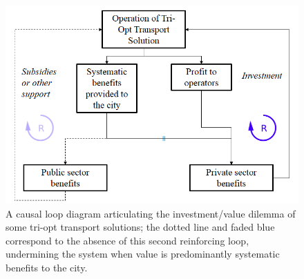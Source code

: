 \documentclass[journal]{IEEEtran}
\begin{document}
\begin{figure}[!htb]
\centering
\includegraphics[width=\columnwidth]{images/causalloop.png}
\caption{A causal loop diagram articulating the investment/value
  dilemma of some tri-opt transport solutions; the dotted line and
  faded blue correspond to the absence of this second reinforcing
  loop, undermining the system when value is predominantly systematic
  benefits to the city.}
\label{fig:causalloop}
\end{figure}









\ifCLASSOPTIONcaptionsoff
  \newpage
\fi
\end{document}

